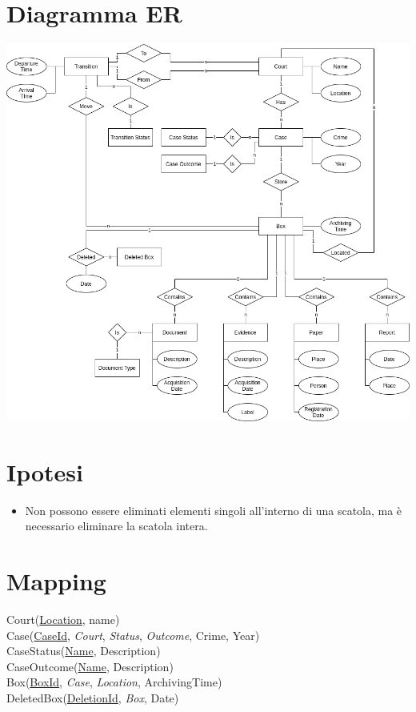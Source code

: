 \documentclass{article}
\begin{document}
\section{Diagramma ER}

\begin{adjustwidth}{-50cm}{-50cm}
    \vspace{\fill}
    \begin{center}
        \includegraphics[scale=0.50]{../images/er.png}
    \end{center}
    \vspace{\fill}
\end{adjustwidth}

\newpage
\section{Ipotesi}

\begin{itemize}
    \item Non possono essere eliminati elementi singoli all'interno di una scatola, ma è necessario eliminare la scatola intera.
\end{itemize}

\section{Mapping}

Court(\underline{Location}, name) \\
Case(\underline{CaseId}, \textit{Court}, \textit{Status}, \textit{Outcome}, Crime, Year) \\
CaseStatus(\underline{Name}, Description) \\
CaseOutcome(\underline{Name}, Description) \\
Box(\underline{BoxId}, \textit{Case}, \textit{Location}, ArchivingTime) \\
DeletedBox(\underline{DeletionId}, \textit{Box}, Date)
\end{document}
